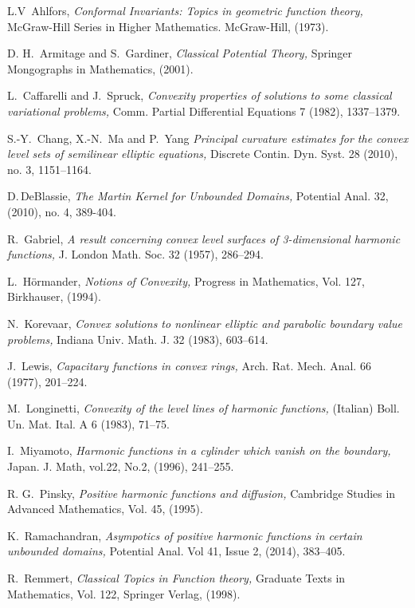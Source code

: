 \documentclass[11pt]{amsart}
\theoremstyle{definition}
\theoremstyle{remark}
\begin{document}
\begin{thebibliography}{999}

 L.V\, Ahlfors, {\it Conformal Invariants: Topics in geometric function theory,}  McGraw-Hill Series in Higher Mathematics. McGraw-Hill, (1973).

 D. H.\, Armitage and S.\, Gardiner, {\it Classical Potential Theory,} Springer Mongographs in Mathematics, (2001).

 L.\, Caffarelli and J.\, Spruck, {\it Convexity properties of solutions to some classical variational problems,} Comm. Partial Differential Equations 7 (1982), 1337–1379.

 S.-Y.\, Chang, X.-N.\, Ma and P.\, Yang {\it Principal curvature estimates for the convex level sets of semilinear elliptic equations,} Discrete Contin. Dyn. Syst. 28 (2010), no. 3, 1151–1164.

 D.\,DeBlassie, {\it The Martin Kernel for Unbounded Domains,} Potential Anal. 32, (2010),  no. 4, 389-404.

 R.\, Gabriel, {\it A result concerning convex level surfaces of 3-dimensional harmonic functions,} J. London Math. Soc. 32 (1957), 286–294.
 
 L.\, H\"{o}rmander, {\it Notions of Convexity,} Progress in Mathematics, Vol. 127, Birkhauser, (1994). 

 N.\, Korevaar, {\it Convex solutions to nonlinear elliptic and parabolic boundary value problems,} Indiana Univ. Math. J. 32 (1983), 603--614.

 J.\, Lewis, {\it Capacitary functions in convex rings,} Arch. Rat. Mech. Anal. 66 (1977), 201–224.

 M.\, Longinetti, {\it Convexity of the level lines of harmonic functions,} (Italian) Boll. Un. Mat. Ital. A 6 (1983), 71–75.

 I.\, Miyamoto, {\it Harmonic functions in a cylinder which vanish on the boundary,} Japan. J. Math, vol.22, No.2, (1996), 241--255.

 R. G.\, Pinsky, {\it Positive harmonic functions and diffusion,} Cambridge Studies in Advanced Mathematics, Vol. 45, (1995).

 K.\, Ramachandran, {\it Asympotics of positive harmonic functions in certain unbounded domains,} Potential Anal. Vol 41, Issue 2, (2014), 383--405.

 R.\, Remmert, {\it Classical Topics in Function theory,} Graduate Texts in Mathematics, Vol. 122, Springer Verlag, (1998).
\end{thebibliography}
\end{document}
